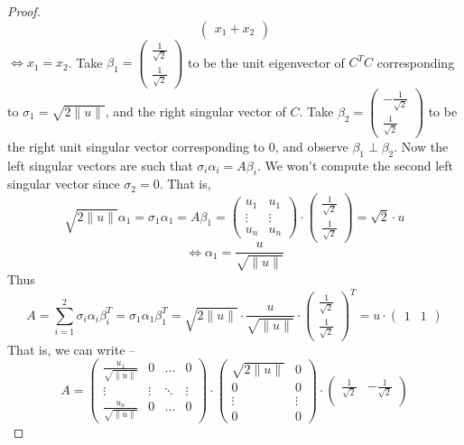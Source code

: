 \documentclass[11pt]{article}
\theoremstyle{quest}
\begin{document}
\begin{proof}
$$\begin{pmatrix}
x_1 + x_2
\end{pmatrix}$$
$\iff x_1 = x_2$. Take $\beta_1 = \begin{pmatrix}
\frac{1}{\sqrt{2}} \\
\frac{1}{\sqrt{2}}
\end{pmatrix}$ to be the unit eigenvector of $C^TC$ corresponding to $\sigma_1 = \sqrt{2\|u\|}$, and the right singular vector of $C$. Take $\beta_2 = \begin{pmatrix}
-\frac{1}{\sqrt{2}} \\
\frac{1}{\sqrt{2}}
\end{pmatrix}$ to be the right unit singular vector corresponding to $0$, and observe $\beta_1 \perp \beta_2$.
Now the left singular vectors are such that $\sigma_i \alpha_i = A \beta_i$. We won't compute the second left singular vector since $\sigma_2 = 0$. That is,
$$\sqrt{2\|u\|} \alpha_1 = \sigma_1 \alpha_1 = A \beta_1 = \begin{pmatrix}
u_1 & u_1 \\
\vdots & \vdots \\
u_n & u_n
\end{pmatrix} \cdot \begin{pmatrix}
\frac{1}{\sqrt{2}} \\
\frac{1}{\sqrt{2}}
\end{pmatrix} = \sqrt{2} \cdot u$$
$$\iff \alpha_1 = \dfrac{u}{\sqrt{\|u\|}}$$
Thus
$$A = \sum_{i=1}^2 \sigma_i \alpha_i \beta_i^T = \sigma_1 \alpha_1 \beta_1^T = \sqrt{2\|u\|} \cdot \dfrac{u}{\sqrt{\|u\|}} \cdot \begin{pmatrix}
\frac{1}{\sqrt{2}} \\
\frac{1}{\sqrt{2}}
\end{pmatrix}^T = u \cdot \begin{pmatrix}
1 & 1
\end{pmatrix} $$
That is, we can write --
$$A = \begin{pmatrix}
\frac{u_1}{\sqrt{\|u\|}} & 0 & \ldots & 0 \\
\vdots & \vdots & \ddots & \vdots \\
\frac{u_n}{\sqrt{\|u\|}} & 0 & \ldots & 0
\end{pmatrix} \cdot \begin{pmatrix}
\sqrt{2\|u\|} & 0 \\
0 & 0 \\
\vdots & \vdots \\
0 & 0
\end{pmatrix} \cdot \begin{pmatrix}
\frac{1}{\sqrt{2}} & -\frac{1}{\sqrt{2}} \\

\end{pmatrix}$$
\end{proof}
\end{document}
